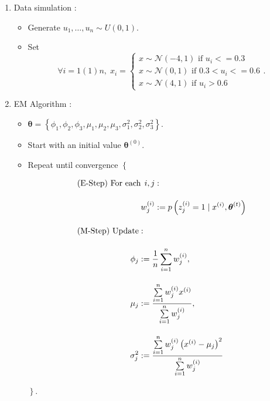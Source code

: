 \documentclass[11pt, a4paper]{article}\usepackage[]{graphicx}\usepackage[]{xcolor}
\newcommand{\bs}[1]{\boldsymbol{#1}}
\begin{document}
\begin{enumerate}

\item[\scalebox{2.0}{\twemoji{keycap: 1}}] \hspace{0.2cm} Data simulation :

\begin{itemize}
\item Generate $u_1, \ldots, u_n \sim U(0, 1)$.

\item Set $$\forall i = 1(1)n, \; x_i = \begin{cases} x \sim \mathcal{N}\!\left(-4, 1\right) \text{ if } u_i <= 0.3 \\[0.5em] x \sim \mathcal{N}\!\left(0, 1\right) \text{ if } 0.3 < u_i <= 0.6 \\[0.5em] x \sim \mathcal{N}\!\left(4, 1\right)\text{ if } u_i > 0.6 \end{cases}.$$
\end{itemize}

\newpage

\item[\scalebox{2.0}{\twemoji{keycap: 2}}] \hspace{0.2cm} EM Algorithm :

\begin{itemize}
\item $\bs{\theta} = \left\{ \phi_1, \phi_2, \phi_3, \mu_1, \mu_2, \mu_3, \sigma_1^2, \sigma_2^2, \sigma_3^2\right\}$.

\item Start with an initial value $\bs{\theta}^{(0)}$.

\item Repeat until convergence $\left\{ \right.$

\begin{align*}
&\text{(E-Step) For each} 
\begin{aligned}[t]
i, j &: \\[1em]
w_{j}^{(i)} &:= p \left( z_{j}^{(i)} = 1 \mid {x}^{(i)}, \bs{\theta}^{(t)} \right)
\end{aligned}\\[1em]
&\text{(M-Step) } 
\begin{aligned}[t]
\text{Update} &: \\[1em]
\hspace{-2em}\phi_j &:= \dfrac{1}{n} \sum \limits_{i=1}^{n}w_j^{(i)}, \\[1em]
{\mu}_j &:= \dfrac{\sum \limits_{i = 1}^{n} w_j^{(i)} {x}^{(i)}}{\sum \limits_{i = 1}^{n} w_j^{(i)}}, \\[1em]
{\sigma}_j^2 &:= \dfrac{\sum \limits_{i=1}^{n} w_j^{(i)} \left({x}^{(i)}-{\mu}_{j}\right)^2}{\sum \limits_{i=1}^{n} w_j^{(i)}}
\end{aligned}
\end{align*}

$\left. \right\}$.
\end{itemize}

\end{enumerate}
\end{document}
